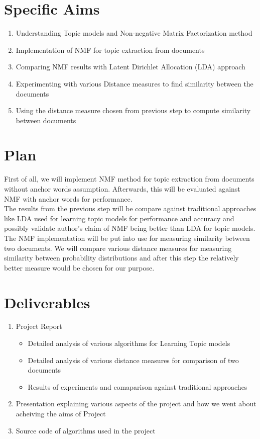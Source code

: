 \documentclass[a4paper,11pt]{article}
\begin{document}
\section{Specific Aims}
\begin{enumerate}
\item Understanding Topic models and Non-negative Matrix Factorization method
\item Implementation of NMF for topic extraction from documents
\item Comparing NMF results with Latent Dirichlet Allocation (LDA) approach
\item Experimenting with various Distance measures to find similarity between the documents
\item Using the distance measure chosen from previous step to compute similarity between documents
\end{enumerate}


\section{Plan}

First of all, we will implement NMF method for topic extraction from documents without anchor words assumption. Afterwards, this will be evaluated against NMF with anchor words for performance. \\

The results from the previous step will be compare against traditional approaches like LDA used for learning topic models for performance and accuracy and possibly validate author's claim of NMF being better than LDA for topic models. \\

The NMF implementation{\cite{nmf}} will be put into use for measuring similarity between two documents. We will compare various distance measures for measuring similarity between probability distributions and after this step the relatively better measure would be chosen for our purpose.   

\section{Deliverables}
\begin{enumerate}
\item Project Report
\begin{itemize}
\item Detailed analysis of various algorithms for Learning Topic models
\item Detailed analysis of various distance measures for comparison of two documents
\item Results of experiments and comaparison against traditional approaches
\end{itemize}
\item Presentation explaining various aspects of the project and how we went about acheiving the aims of Project
\item Source code of algorithms used in the project
\end{enumerate}
\end{document}
